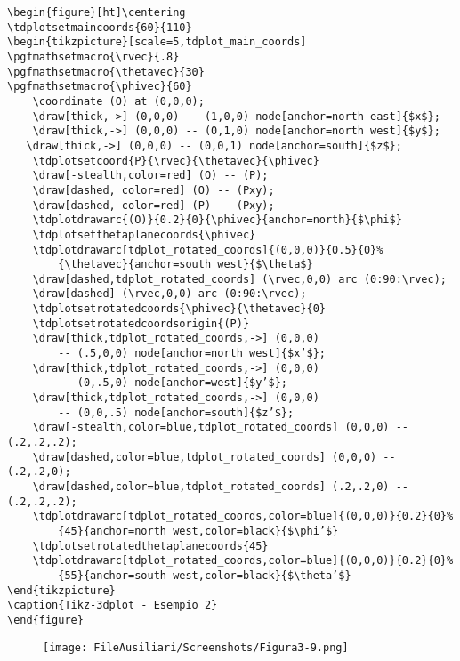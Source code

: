 \newpage
\begin{verbatim}
\begin{figure}[ht]\centering
\tdplotsetmaincoords{60}{110}
\begin{tikzpicture}[scale=5,tdplot_main_coords]
\pgfmathsetmacro{\rvec}{.8}
\pgfmathsetmacro{\thetavec}{30}
\pgfmathsetmacro{\phivec}{60}
    \coordinate (O) at (0,0,0);
    \draw[thick,->] (0,0,0) -- (1,0,0) node[anchor=north east]{$x$};
    \draw[thick,->] (0,0,0) -- (0,1,0) node[anchor=north west]{$y$};
   \draw[thick,->] (0,0,0) -- (0,0,1) node[anchor=south]{$z$};
    \tdplotsetcoord{P}{\rvec}{\thetavec}{\phivec}
    \draw[-stealth,color=red] (O) -- (P);
    \draw[dashed, color=red] (O) -- (Pxy);
    \draw[dashed, color=red] (P) -- (Pxy);
    \tdplotdrawarc{(O)}{0.2}{0}{\phivec}{anchor=north}{$\phi$}
    \tdplotsetthetaplanecoords{\phivec}
    \tdplotdrawarc[tdplot_rotated_coords]{(0,0,0)}{0.5}{0}%
        {\thetavec}{anchor=south west}{$\theta$}
    \draw[dashed,tdplot_rotated_coords] (\rvec,0,0) arc (0:90:\rvec);
    \draw[dashed] (\rvec,0,0) arc (0:90:\rvec);
    \tdplotsetrotatedcoords{\phivec}{\thetavec}{0}
    \tdplotsetrotatedcoordsorigin{(P)}
    \draw[thick,tdplot_rotated_coords,->] (0,0,0)
        -- (.5,0,0) node[anchor=north west]{$x’$};
    \draw[thick,tdplot_rotated_coords,->] (0,0,0)
        -- (0,.5,0) node[anchor=west]{$y’$};
    \draw[thick,tdplot_rotated_coords,->] (0,0,0)
        -- (0,0,.5) node[anchor=south]{$z’$};
    \draw[-stealth,color=blue,tdplot_rotated_coords] (0,0,0) -- (.2,.2,.2);
    \draw[dashed,color=blue,tdplot_rotated_coords] (0,0,0) -- (.2,.2,0);
    \draw[dashed,color=blue,tdplot_rotated_coords] (.2,.2,0) -- (.2,.2,.2);
    \tdplotdrawarc[tdplot_rotated_coords,color=blue]{(0,0,0)}{0.2}{0}%
        {45}{anchor=north west,color=black}{$\phi’$}
    \tdplotsetrotatedthetaplanecoords{45}
    \tdplotdrawarc[tdplot_rotated_coords,color=blue]{(0,0,0)}{0.2}{0}%
        {55}{anchor=south west,color=black}{$\theta’$}
\end{tikzpicture}
\caption{Tikz-3dplot - Esempio 2}
\end{figure}
\end{verbatim}

\begin{figure}[ht]\centering
\texttt{[image: FileAusiliari/Screenshots/Figura3-9.png]}
\end{figure}